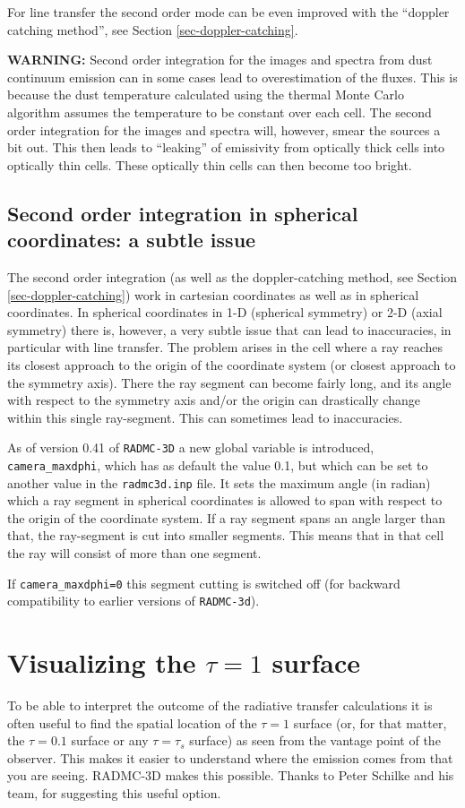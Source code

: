 \documentclass{report}
\begin{document}
For line transfer the second order mode can be even improved with the
``doppler catching method'', see Section \ref{sec-doppler-catching}.

{\bf WARNING:} Second order integration for the images and spectra from dust
continuum emission can in some cases lead to overestimation of the fluxes.
This is because the dust temperature calculated using the thermal Monte
Carlo algorithm assumes the temperature to be constant over each cell. The
second order integration for the images and spectra will, however, smear the
sources a bit out. This then leads to ``leaking'' of emissivity from
optically thick cells into optically thin cells. These optically thin cells
can then become too bright.

\subsection{Second order integration in spherical coordinates: a subtle issue}
\label{sec-secord-spher}
%
The second order integration (as well as the doppler-catching method, see
Section \ref{sec-doppler-catching}) work in cartesian coordinates as well as
in spherical coordinates. In spherical coordinates in 1-D (spherical
symmetry) or 2-D (axial symmetry) there is, however, a very subtle issue
that can lead to inaccuracies, in particular with line transfer. The problem
arises in the cell where a ray reaches its closest approach to the origin of
the coordinate system (or closest approach to the symmetry axis). There the
ray segment can become fairly long, and its angle with respect to the
symmetry axis and/or the origin can drastically change within this single
ray-segment. This can sometimes lead to inaccuracies. 

As of version 0.41 of {\small\tt RADMC-3D} a new global variable is
introduced, {\small\tt camera\_maxdphi}, which has as default the value 0.1,
but which can be set to another value in the {\small\tt radmc3d.inp} file.
It sets the maximum angle (in radian) which a ray segment in spherical
coordinates is allowed to span with respect to the origin of the coordinate
system. If a ray segment spans an angle larger than that, the ray-segment 
is cut into smaller segments. This means that in that cell the ray will
consist of more than one segment. 

If {\small\tt camera\_maxdphi=0} this segment cutting is switched off (for
backward compatibility to earlier versions of {\small\tt RADMC-3d}). 


\section{Visualizing the $\tau=1$ surface}
\label{sec-tausurf}
%
To be able to interpret the outcome of the radiative transfer calculations
it is often useful to find the spatial location of the $\tau=1$ surface (or,
for that matter, the $\tau=0.1$ surface or any $\tau=\tau_s$ surface) as
seen from the vantage point of the observer. This makes it easier to
understand where the emission comes from that you are seeing. RADMC-3D makes
this possible. Thanks to Peter Schilke and his team, for suggesting this
useful option.
\end{document}

